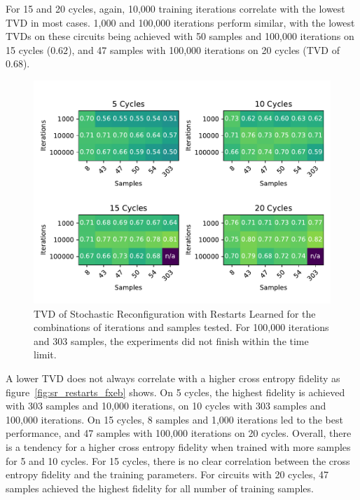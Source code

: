 For 15 and 20 cycles, again, 10,000 training iterations correlate with the lowest TVD in most cases. 1,000
and 100,000 iterations perform similar, with the lowest TVDs on these circuits being achieved with 50 samples and 
100,000 iterations on 15 cycles ($0.62$), and 47 samples with 100,000 iterations on 20 cycles (TVD of $0.68$).

\begin{figure}[H]
  \centering
  \includegraphics[width=\textwidth]{figures/results/SR-restarts-learned/tvd_heatmap.pdf}
  \caption[TVD of Stochastic Reconfiguration with Restarts Learned]{TVD of Stochastic 
  Reconfiguration with Restarts Learned for the combinations of iterations and samples tested.
  For 100,000 iterations and 303 samples, the experiments did not finish within the time limit.}
  \label{fig:sr_restarts_tvd}
\end{figure}

A lower TVD does not always correlate with a higher cross entropy fidelity as figure~\ref{fig:sr_restarts_fxeb}
shows. On 5 cycles, the highest fidelity is achieved with 303 samples and 10,000 iterations, on 10 cycles 
with 303 samples and 100,000 iterations. On 15 cycles, 8 samples and 1,000 iterations led to the best performance, 
and 47 samples with 100,000 iterations on 20 cycles. Overall, there is a tendency for a higher cross entropy fidelity 
when trained with more samples for 5 and 10 cycles. For 15 cycles, there is no clear correlation between the 
cross entropy fidelity and the training parameters. For circuits with 20 cycles, 47 samples achieved the highest 
fidelity for all number of training samples.

